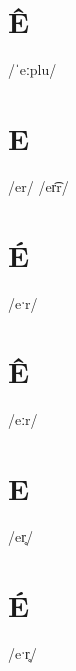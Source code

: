 \documentclass[10pt,a4paper,twoside]{book}
\begin{document}
\section*{Ê}

\begin{multicols}{3}
 {/ˈeːplu/} {}
\end{multicols}

\section*{E}

\begin{multicols}{3}
 {/er/} {}
 {/er͡r/} {}
\end{multicols}

\section*{É}

\begin{multicols}{3}
 {/eˑr/} {}
\end{multicols}

\section*{Ê}

\begin{multicols}{3}
 {/eːr/} {}
\end{multicols}

\section*{E}

\begin{multicols}{3}
 {/er̥/} {}
\end{multicols}

\section*{É}

\begin{multicols}{3}
 {/eˑr̥/} {}
\end{multicols}
\end{document}
